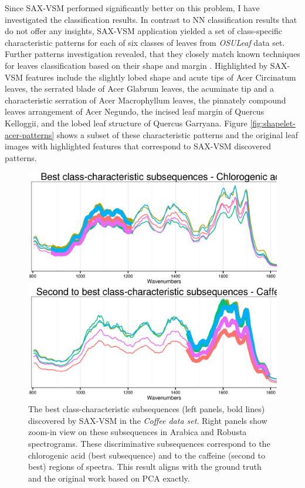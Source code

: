 Since SAX-VSM performed significantly better on this problem, I have investigated the classification results.
In contrast to NN classification results that do not offer any insights, SAX-VSM application yielded a set of 
class-specific characteristic patterns for each of six classes of leaves from \textit{OSULeaf} data set. 
Further patterns investigation revealed, that they closely match known techniques for leaves classification based 
on their shape and margin \cite{citeulike:12134192}. 
Highlighted by SAX-VSM features include 
the slightly lobed shape and acute tips of Acer Circinatum leaves, 
the serrated blade of Acer Glabrum leaves, 
the acuminate tip and a characteristic serration of Acer Macrophyllum leaves, 
the pinnately compound leaves arrangement of Acer Negundo, 
the incised leaf margin of Quercus Kelloggii, 
and the lobed leaf structure of Quercus Garryana. 
Figure \ref{fig:shapelet-acer-patterns} shows a subset of these characteristic patterns and the original
leaf images with highlighted features that correspond to SAX-VSM discovered patterns.

\begin{figure}[!h!t]
   \centering
   \includegraphics[width=120mm]{figures/coffee_patterns.ps}
   \caption[The best class-characteristic subsequences (left panels, bold lines) discovered by SAX-VSM in
   the \textit{Coffee data set}.]{The best class-characteristic subsequences (left panels, bold lines) discovered by SAX-VSM in
   the \textit{Coffee data set}. Right panels show zoom-in view on these subsequences in Arabica
   and Robusta spectrograms.
   These discriminative subsequences correspond to the chlorogenic acid (best subsequence) 
   and to the caffeine (second to best) regions of spectra. This result aligns with
   the ground truth and the original work based on PCA \cite{citeulike:12550833} exactly.  }
   \label{fig:coffee}
\end{figure}

